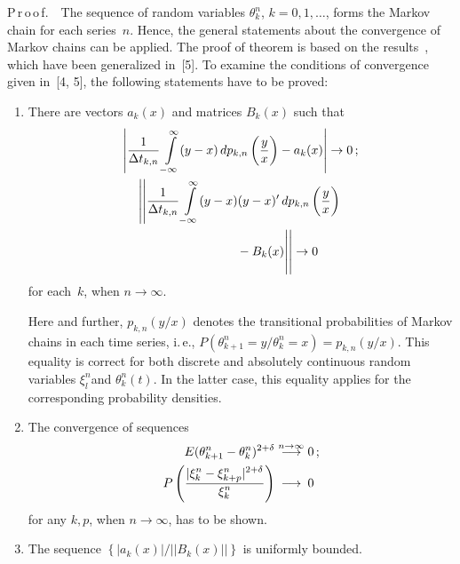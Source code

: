 \begin{multicols}{2}
\noindent 
P\,r\,o\,o\,f.\ \ 
The sequence of random variables $\theta_{k}^{n} $, $k$\linebreak $=0,1,\dots$,  
forms the Markov chain for each series~$n$. Hence, the general statements 
about the convergence of Markov chains can be applied. The proof of theorem 
is based on the results~\cite{4-b}, which have been generalized in~[5]. To examine the 
conditions 
of convergence given in~[4, 5], the following statements have to be proved:
\begin{enumerate}[I]
\item  There are vectors $a_{k} (x)$ and matrices $B_{k} (x)$ such that
\begin{gather*}
\left\vert\fr{1}{\Delta t_{k,n} } \int\limits_{-\infty }^{\infty }(y-x)\,dp_{k,n}  
\left(\fr{y}{x}\right)-a_{k} (x)\right\vert\to 0\,;
\\
\left\vert\left\vert\fr{1}{\Delta t_{k,n} }
 \int\limits_{-\infty }^{\infty }(y-x)(y-x)'\,dp_{k,n}  \left(\fr{y}{x}\right)\right.\right.\\
\hspace*{20mm}\left.\left. {}-B_{k} (x)
\vphantom{\int\limits_\infty^\infty}\right\vert\right\vert\to 0
\end{gather*}
for each~$k$, when $n \rightarrow \infty$.

Here and further, $p_{k,n} (y/x)$ denotes the transitional 
probabilities of Markov chains in each time series, i.\,e., 
$P(\theta_{k+1}^{n} =y/\theta_{k}^{n} =x)=p_{k,n} (y/x)$. 
This equality is correct for both discrete and absolutely continuous random 
variables $\xi_{l}^{n} $and $\theta_{k}^{n} (t)$. In the latter case, this equality 
applies for the corresponding probability densities.

\item
The convergence of sequences
\begin{align*}
E(\theta_{k+1}^{n} -\theta_{k}^{n} )^{2+\delta } & \stackrel{n\to \infty }{\longrightarrow} 0\,;
\\
P\left(\displaystyle\frac{\displaystyle |\xi_{k}^{n} -\xi_{k+p}^{n} |^{2+\delta } \mathstrut}{\displaystyle \xi_{k}^{n}\mathstrut} \right)&
\stackrel{\hphantom{n\to \infty}}{\longrightarrow} 0
\end{align*}
for any $k, p$, when $n \rightarrow \infty$, has to be shown.
\item
The sequence 
$
\left\{ {|a_{k} (x)|}/{||B_{k} (x)||} \right\}$ 
is uniformly bounded.
\end{enumerate}



\end{multicols}
